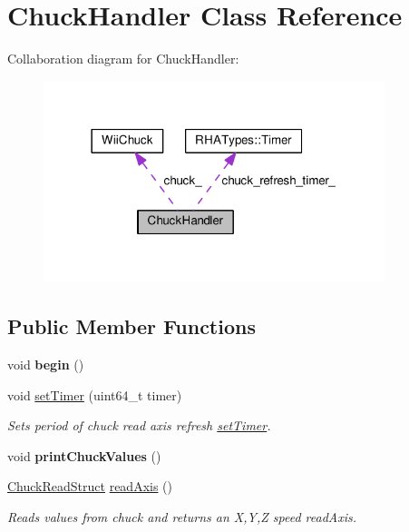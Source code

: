 \hypertarget{classChuckHandler}{}\section{Chuck\+Handler Class Reference}
\label{classChuckHandler}


Collaboration diagram for Chuck\+Handler\+:
\nopagebreak
\begin{figure}[H]
\begin{center}
\leavevmode
\includegraphics[width=282pt]{classChuckHandler__coll__graph}
\end{center}
\end{figure}
\subsection*{Public Member Functions}
\begin{DoxyCompactItemize}
\item 
void {\bfseries begin} ()\hypertarget{classChuckHandler_a597615a4c9c59695f9f90fa92aabb16a}{}\label{classChuckHandler_a597615a4c9c59695f9f90fa92aabb16a}

\item 
void \hyperlink{classChuckHandler_a620dc12c931d8e9c8a4b5f21a2942ff0}{set\+Timer} (uint64\+\_\+t timer)
\begin{DoxyCompactList}\small\item\em Sets period of chuck read axis refresh  \hyperlink{classsetTimer}{set\+Timer}. \end{DoxyCompactList}\item 
void {\bfseries print\+Chuck\+Values} ()\hypertarget{classChuckHandler_a0f981cf4f01387288b6f3aaf80ffc358}{}\label{classChuckHandler_a0f981cf4f01387288b6f3aaf80ffc358}

\item 
\hyperlink{structChuckReadStruct}{Chuck\+Read\+Struct} \hyperlink{classChuckHandler_a0e8e13f42c4147df1a31f9a1c4ca8102}{read\+Axis} ()
\begin{DoxyCompactList}\small\item\em Reads values from chuck and returns an X,Y,Z speed  read\+Axis. \end{DoxyCompactList}\end{DoxyCompactItemize}
